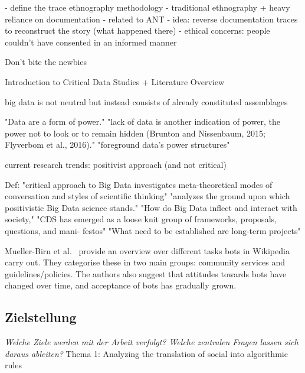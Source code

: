 \documentclass[pdftex,a4paper,11pt]{scrartcl}
\begin{document}
\cite{GeiRib2011}
- define the trace ethnography methodology
- traditional ethnography + heavy reliance on documentation
- related to ANT
- idea: reverse documentation traces to reconstruct the story (what happened
  there)
- ethical concerns: people couldn't have consented in an informed manner


\cite{HalKitRied2011}
Don't bite the newbies

\cite{IliadisRusso2016}
Introduction to Critical Data Studies + Literature Overview

big data is not neutral but instead consists of already constituted assemblages

"Data are a form of power."
"lack of data is another indication of power, the power
not to look or to remain hidden (Brunton and
Nissenbaum, 2015; Flyverbom et al., 2016)."
"foreground data’s power structures"

current research trends: positivist approach (and not critical)

Def:
"critical approach to Big Data
investigates meta-theoretical modes of conversation
and styles of scientific thinking"
"analyzes the
ground upon which positivistic Big Data science stands."
"How do Big Data inflect and interact with society,"
"CDS has emerged as a loose knit group of
frameworks, proposals, questions, and mani-
festos"
"What need to be established are long-term projects"

\cite{MuellerBirn2014}
  Mueller-Birn et al.~\cite{MuellerBirn2014} provide an overview over different tasks bots in Wikipedia carry out.
  They categorise these in two main groups: community services and guidelines/policies.
  The authors also suggest that attitudes towards bots have changed over time, and acceptance of bots has gradually grown.

\subsection{Zielstellung}
\noindent \emph{Welche Ziele werden mit der Arbeit verfolgt? Welche zentralen Fragen lassen sich daraus ableiten?}
Thema 1: Analyzing the translation of social into algorithmic rules
\end{document}
